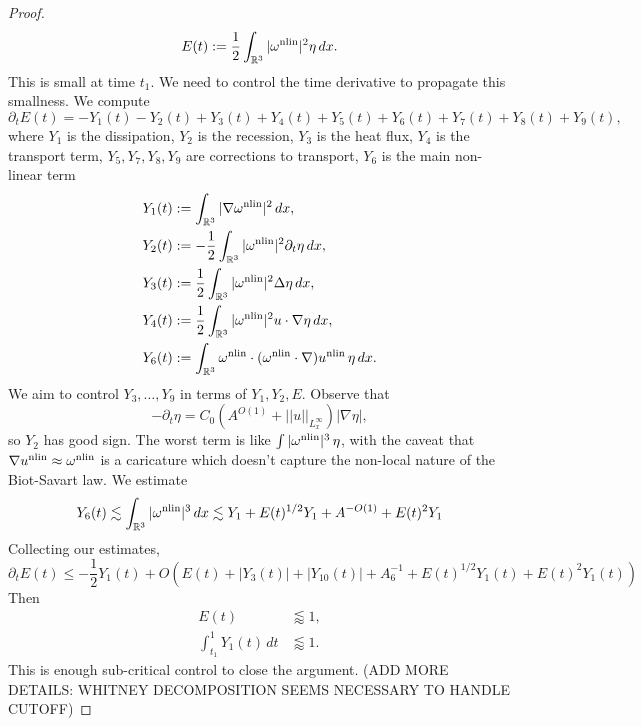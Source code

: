 \begin{proof}
		\[
			E(t)
				:= \frac12 \int_{\mathbb R^3} |\omega^{\mathrm{nlin}}|^2 \eta \, dx.
		\]
	This is small at time $t_1$. We need to control the time derivative to propagate this smallness. We compute
		\[
			\partial_t E(t) = -Y_1 (t) - Y_2 (t) + Y_3 (t) + Y_4 (t) + Y_5 (t) + Y_6 (t) + Y_7 (t) + Y_8 (t) + Y_9 (t),
		\]
	where $Y_1$ is the dissipation, $Y_2$ is the recession, $Y_3$ is the heat flux, $Y_4$ is the transport term, $Y_5, Y_7, Y_8, Y_9$ are corrections to transport, $Y_6$ is the main non-linear term
		\begin{align*}
			Y_1 (t)
				&:= \int_{\mathbb R^3} |\nabla \omega^{\mathrm{nlin}} |^2 \, dx,\\
			Y_2 (t)
				&:= -\frac12 \int_{\mathbb R^3} |\omega^{\mathrm{nlin}} |^2 \partial_t \eta \, dx, \\
			Y_3 (t)
				&:= \frac12 \int_{\mathbb R^3} |\omega^{\mathrm{nlin}}|^2 \Delta \eta \, dx, \\
			Y_4 (t)
				&:= \frac12 \int_{\mathbb R^3} |\omega^{\mathrm{nlin}}|^2 u \cdot \nabla \eta \, dx, \\
			Y_6 (t)
				&:= \int_{\mathbb R^3} \omega^{\mathrm{nlin}} \cdot (\omega^{\mathrm{nlin}} \cdot \nabla) u^{\mathrm{nlin}} \, \eta \, dx. 				
		\end{align*}
	We aim to control $Y_3, \dots, Y_9$ in terms of $Y_1, Y_2, E$. Observe that 
		\[
			-\partial_t \eta = C_0 (A^{O(1) }+ ||u||_{L^\infty_x}) |\nabla \eta|,
		\]
	so $Y_2$ has good sign. The worst term is like $\int |\omega^{\mathrm{nlin}}|^3 \, \eta$, with the caveat that $\nabla u^{\mathrm{nlin}} \approx \omega^{\mathrm{nlin}}$ is a caricature which doesn't capture the non-local nature of the Biot-Savart law. We estimate
		\begin{align*}
			Y_6 (t)
				\lesssim  \int_{\mathbb R^3} |\omega^{\mathrm{nlin}}|^3 \, dx 
				\lesssim Y_1 + E(t)^{1/2} Y_1 + A^{-O(1)} + E(t)^2 Y_1
		\end{align*}
	Collecting our estimates, 
		\[
			\partial_t E(t) 
				\leq - \frac12 Y_1 (t) + O\left(E(t) + |Y_3 (t)| + |Y_{10} (t)| + A_6^{-1} + E(t)^{1/2} Y_1 (t) + E(t)^2 Y_1 (t) \right)
		\]	
	Then 
		\begin{align*}
			E(t)
				&\lessapprox 1, \\
			\int_{t_1}^1 Y_1 (t) \, dt
				&\lessapprox 1. 	
		\end{align*}	
	This is enough sub-critical control to close the argument. (ADD MORE DETAILS: WHITNEY DECOMPOSITION SEEMS NECESSARY TO HANDLE CUTOFF) 	
\end{proof}


